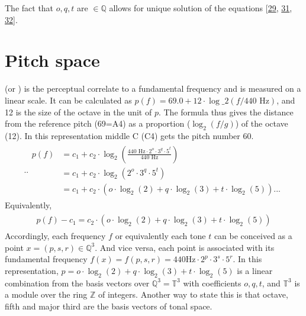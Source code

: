 \documentclass[letterpaper,10pt,english]{sphinxmanual}
\begin{document}
\sphinxAtStartPar
The fact that \(o, q, t\) are \(\in \mathbb Q\) allows for
unique solution of the equations
{[}\hyperlink{cite.8_bibliography:id46}{29}, \hyperlink{cite.8_bibliography:id45}{31}, \hyperlink{cite.8_bibliography:id4}{32}{]}.


\section{Pitch space}
\label{\detokenize{5_notes:pitch-space}}
\sphinxAtStartPar
{} (or ) is the perceptual correlate to a fundamental
frequency and is measured on a linear scale. It can be calculated as
\(p(f) = 69.0 + 12 \cdot \log\_2(f/440 \text{ Hz}) \), and 12 is the
size of the octave in the unit of \(p\). The formula thus gives the
distance from the reference pitch (69=A4) as a proportion
(\(\log_2(f/g)\)) of the octave (12). In this representation middle
C (C4) gets the pitch number 60.
\begin{equation*}
\begin{split}.. \begin{aligned}
 p(f) & = c_1+c_2\cdot \log_2\left(\frac{440 \text{ Hz}\cdot 2^o \cdot 3^q \cdot 5^t}{440\text{ Hz}}\right)\\
      & = c_1+c_2\cdot \log_2\left(2^o\cdot3^q\cdot5^t\right) \\
            & = c_1+c_2 \cdot (o\cdot\log_2(2) + q\cdot \log_2(3) + t\cdot\log_2(5) ).
.. \end{aligned}\end{split}
\end{equation*}
\sphinxAtStartPar
Equivalently,
\begin{equation*}
\begin{split}\begin{aligned}
  p(f)- c_1 = c_2 \cdot (o\cdot\log_2(2) + q\cdot \log_2(3) + t\cdot\log_2(5) )\end{aligned}\end{split}
\end{equation*}
\sphinxAtStartPar
Accordingly, each frequency \(f\) or equivalently each tone
\(t\) can be conceived as a point
\(x = (p, s, r) \in \mathbb Q^3\). And vice versa, each point is
associated with its fundamental frequency
\(f(x) = f(p, s, r) = 440 \text{Hz} \cdot 2^p \cdot 3^s \cdot 5^r\).
In this representation,
\(p = o \cdot \log_2(2) + q\cdot \log_2(3) + t\cdot \log_2(5)\) is a
linear combination from the basis vectors over
\(\mathbb Q^3 = \mathbb T^3\) with coefficients \(o, q, t\), and
\(\mathbb T^3\) is a module over the ring \(\mathbb Z\) of
integers. Another way to state this is that octave, fifth and major
third are the basis vectors of tonal space.
\end{document}
